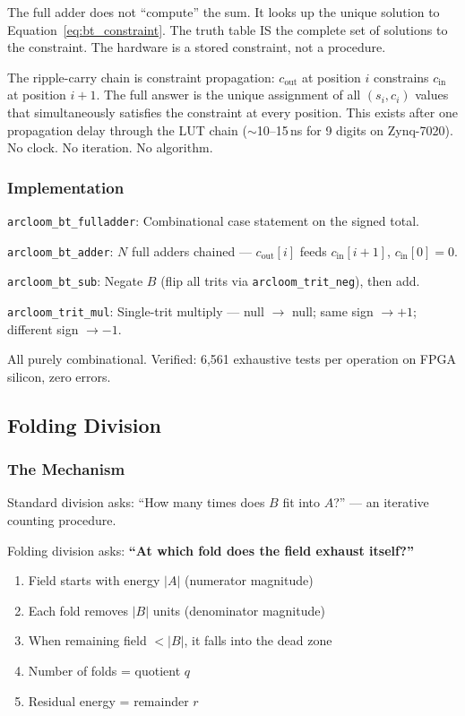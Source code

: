 \documentclass[11pt,a4paper]{article}
\begin{document}
The full adder does not ``compute'' the sum. It looks up the unique solution to Equation~\ref{eq:bt_constraint}. The truth table IS the complete set of solutions to the constraint. The hardware is a stored constraint, not a procedure.

The ripple-carry chain is constraint propagation: $c_{\text{out}}$ at position $i$ constrains $c_{\text{in}}$ at position $i+1$. The full answer is the unique assignment of all $(s_i, c_i)$ values that simultaneously satisfies the constraint at every position. This exists after one propagation delay through the LUT chain ($\sim$10--15\,ns for 9 digits on Zynq-7020). No clock. No iteration. No algorithm.

\subsubsection{Implementation}

\texttt{arcloom\_bt\_fulladder}: Combinational case statement on the signed total.

\texttt{arcloom\_bt\_adder}: $N$ full adders chained --- $c_{\text{out}}[i]$ feeds $c_{\text{in}}[i+1]$, $c_{\text{in}}[0] = 0$.

\texttt{arcloom\_bt\_sub}: Negate $B$ (flip all trits via \texttt{arcloom\_trit\_neg}), then add.

\texttt{arcloom\_trit\_mul}: Single-trit multiply --- null $\rightarrow$ null; same sign $\rightarrow +1$; different sign $\rightarrow -1$.

All purely combinational. Verified: 6,561 exhaustive tests per operation on FPGA silicon, zero errors.

\subsection{Folding Division}

\subsubsection{The Mechanism}

Standard division asks: ``How many times does $B$ fit into $A$?'' --- an iterative counting procedure.

Folding division asks: \textbf{``At which fold does the field exhaust itself?''}

\begin{enumerate}
    \item Field starts with energy $|A|$ (numerator magnitude)
    \item Each fold removes $|B|$ units (denominator magnitude)
    \item When remaining field $< |B|$, it falls into the dead zone
    \item Number of folds = quotient $q$
    \item Residual energy = remainder $r$
\end{enumerate}
\end{document}
